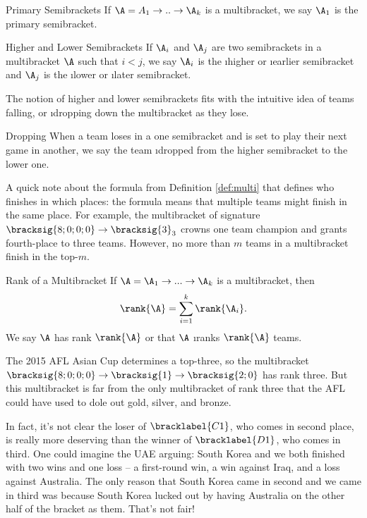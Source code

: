 {    \begin{definition}{Primary Semibrackets}{}
        If $\A = A_1 \to .. \to \A_k$ is a multibracket, we say $\A_1$ is the primary semibracket.
    \end{definition}

    \begin{definition}{Higher and Lower Semibrackets}{}
        If $\A_i$ and $\A_j$ are two semibrackets in a multibracket $\A$ such that $i < j$, we say $\A_i$ is the \i{higher} or \i{earlier} semibracket and $\A_j$ is the \i{lower} or \i{later} semibracket.
    \end{definition}

    The notion of higher and lower semibrackets fits with the intuitive idea of teams falling, or \i{dropping} down the multibracket as they lose.
    
    \begin{definition}{Dropping}{}
        When a team loses in a one semibracket and is set to play their next game in another, we say the team \i{dropped} from the higher semibracket to the lower one.
    \end{definition}

    A quick note about the formula from Definition \ref{def:multi} that defines who finishes in which places: the formula means that multiple teams might finish in the same place. For example, the multibracket of signature $\bracksig{8;0;0;0} \to \bracksig{3}_3$ crowns one team champion and grants fourth-place to three teams. However, no more than $m$ teams in a multibracket finish in the top-$m$.

    \begin{definition}{Rank of a Multibracket}{}
        If $\A = \A_1 \to ... \to \A_k$ is a multibracket, then $$\rank{\A} = \sum_{i=1}^k \rank{\A_i}.$$ We say $\A$ has rank $\rank{\A}$ or that $\A$ \i{ranks} $\rank{\A}$ teams.
    \end{definition}

    The 2015 AFL Asian Cup determines a top-three, so the multibracket $\bracksig{8;0;0;0} \to \bracksig{1} \to \bracksig{2;0}$ has rank three. But this multibracket is far from the only multibracket of rank three that the AFL could have used to dole out gold, silver, and bronze.
    
    In fact, it's not clear the loser of $\bracklabel{C1}$, who comes in second place, is really more deserving than the winner of $\bracklabel{D1}$, who comes in third. One could imagine the UAE arguing: South Korea and we both finished with two wins and one loss -- a first-round win, a win against Iraq, and a loss against Australia. The only reason that South Korea came in second and we came in third was because South Korea lucked out by having Australia on the other half of the bracket as them. That's not fair!

}
